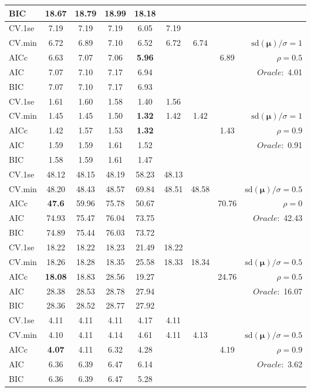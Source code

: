 \begin{table}
\begin{center}
\begin{tabular}{l*{7}{c}|r}
BIC & 18.67 & 18.79 & 18.99 & 18.18 & & & &  \\
 \hline 
CV.1se & 7.19 & 7.19 & 7.19 & 6.05 & 7.19 & & & \\
CV.min & 6.72 & 6.89 & 7.10 & 6.52 & 6.72 & 6.74 & & $\mathrm{sd}(\mathbf{\mu})/\sigma=1$ \\
AICc & 6.63 & 7.07 & 7.06 & {\bf 5.96} & & & 6.89 &  $\rho=0.5$ \\
AIC & 7.07 & 7.10 & 7.17 & 6.94 & & & &  \multirow{2}{*}{$Oracle: $ 4.01} \\
BIC & 7.07 & 7.10 & 7.17 & 6.93 & & & &  \\
 \hline 
CV.1se & 1.61 & 1.60 & 1.58 & 1.40 & 1.56 & & & \\
CV.min & 1.45 & 1.45 & 1.50 & {\bf 1.32} & 1.42 & 1.42 & & $\mathrm{sd}(\mathbf{\mu})/\sigma=1$ \\
AICc & 1.42 & 1.57 & 1.53 & {\bf 1.32} & & & 1.43 &  $\rho=0.9$ \\
AIC & 1.59 & 1.59 & 1.61 & 1.52 & & & &  \multirow{2}{*}{$Oracle: $ 0.91} \\
BIC & 1.58 & 1.59 & 1.61 & 1.47 & & & &  \\
 \hline 
CV.1se & 48.12 & 48.15 & 48.19 & 58.23 & 48.13 & & & \\
CV.min & 48.20 & 48.43 & 48.57 & 69.84 & 48.51 & 48.58 & & $\mathrm{sd}(\mathbf{\mu})/\sigma=0.5$ \\
AICc & {\bf 47.6} & 59.96 & 75.78 & 50.67 & & & 70.76 &  $\rho=0$ \\
AIC & 74.93 & 75.47 & 76.04 & 73.75 & & & &  \multirow{2}{*}{$Oracle: $ 42.43} \\
BIC & 74.89 & 75.44 & 76.03 & 73.72 & & & &  \\
 \hline 
CV.1se & 18.22 & 18.22 & 18.23 & 21.49 & 18.22 & & & \\
CV.min & 18.26 & 18.28 & 18.35 & 25.58 & 18.33 & 18.34 & & $\mathrm{sd}(\mathbf{\mu})/\sigma=0.5$ \\
AICc & {\bf 18.08} & 18.83 & 28.56 & 19.27 & & & 24.76 &  $\rho=0.5$ \\
AIC & 28.38 & 28.53 & 28.78 & 27.94 & & & &  \multirow{2}{*}{$Oracle: $ 16.07} \\
BIC & 28.36 & 28.52 & 28.77 & 27.92 & & & &  \\
 \hline 
CV.1se & 4.11 & 4.11 & 4.11 & 4.17 & 4.11 & & & \\
CV.min & 4.10 & 4.11 & 4.14 & 4.61 & 4.11 & 4.13 & & $\mathrm{sd}(\mathbf{\mu})/\sigma=0.5$ \\
AICc & {\bf 4.07} & 4.11 & 6.32 & 4.28 & & & 4.19 &  $\rho=0.9$ \\
AIC & 6.36 & 6.39 & 6.47 & 6.14 & & & &  \multirow{2}{*}{$Oracle: $ 3.62} \\
BIC & 6.36 & 6.39 & 6.47 & 5.28 & & & &  \\
 \hline 
\end{tabular}
\end{center}
\vspace{-1cm}
\end{table}




